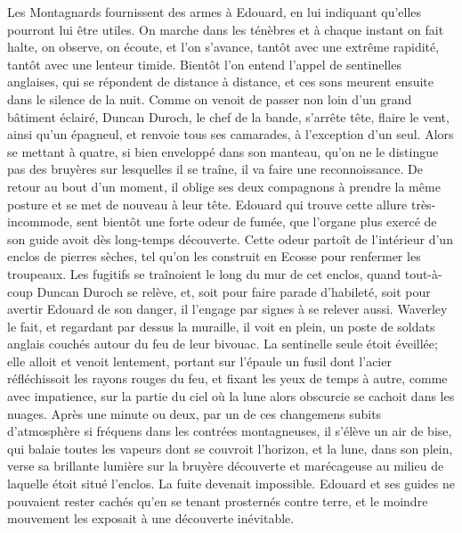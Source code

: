 {Les Montagnards fournissent des armes à Edouard, en lui indiquant qu'elles pourront lui être utiles. On marche dans les ténèbres et à chaque instant on fait halte, on observe, on écoute, et l'on s'avance, tantôt avec une extrême rapidité, tantôt avec une lenteur timide. Bientôt l'on entend l'appel de sentinelles anglaises, qui se répondent de distance à distance, et ces sons meurent ensuite dans le silence de la nuit. Comme on venoit de passer non loin d'un grand bâtiment éclairé, Duncan Duroch, le chef de la bande, s'arrête\setcounter{page}{221} tête, flaire le vent, ainsi qu'un épagneul, et renvoie tous ses camarades, à l'exception d'un seul. Alors se mettant à quatre, si bien enveloppé dans son manteau, qu'on ne le distingue pas des bruyères sur lesquelles il se traîne, il va faire une reconnoissance. De retour au bout d'un moment, il oblige ses deux compagnons à prendre la même posture et se met de nouveau à leur tête. Edouard qui trouve cette allure très-incommode, sent bientôt une forte odeur de fumée, que l'organe plus exercé de son guide avoit dès long-temps découverte. Cette odeur partoît de l'intérieur d'un enclos de pierres sèches, tel qu'on les construit en Ecosse pour renfermer les troupeaux. Les fugitifs se traînoient le long du mur de cet enclos, quand tout-à-coup Duncan Duroch se relève, et, soit pour faire parade d'habileté, soit pour avertir Edouard de son danger, il l'engage par signes à se relever aussi. Waverley le fait, et regardant par dessus la muraille, il voit en plein, un poste de soldats anglais couchés autour du feu de leur bivouac. La sentinelle seule étoit éveillée; elle alloit et venoit lentement, portant sur l'épaule un fusil dont l'acier réfléchissoit les rayons rouges du feu, et fixant les yeux de temps à autre, comme\setcounter{page}{222} avec impatience, sur la partie du ciel où la lune alors obscurcie se cachoit dans les nuages.
Après une minute ou deux, par un de ces changemens subits d'atmosphère si fréquens dans les contrées montagneuses, il s'élève un air de bise, qui balaie toutes les vapeurs dont se couvroit l'horizon, et la lune, dans son plein, verse sa brillante lumière sur la bruyère découverte et marécageuse au milieu de laquelle étoit situé l'enclos.
La fuite devenait impossible. Edouard et ses guides ne pouvaient rester cachés qu'en se tenant prosternés contre terre, et le moindre mouvement les exposait à une découverte inévitable.
}
